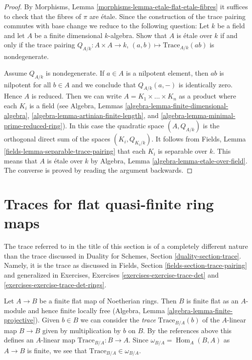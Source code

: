 \documentclass{stacks-project}
\theoremstyle{plain}
\theoremstyle{definition}
\theoremstyle{remark}
\numberwithin{equation}{subsection}
\def\Hom{\mathop{\mathrm{Hom}}\nolimits}
\begin{document}
\begin{proof}
By Morphisms, Lemma \ref{morphisms-lemma-etale-flat-etale-fibres}
it suffices to check that the fibres of $\pi$ are \'etale.
Since the construction of the trace pairing commutes with base
change we reduce to the following question: Let $k$ be a field
and let $A$ be a finite dimensional $k$-algebra. Show that
$A$ is \'etale over $k$ if and only if the trace pairing
$Q_{A/k} : A \times A \to k$, $(a, b) \mapsto \text{Trace}_{A/k}(ab)$
is nondegenerate.

\medskip\noindent
Assume $Q_{A/k}$ is nondegenerate. If $a \in A$ is a nilpotent element, then
$ab$ is nilpotent for all $b \in A$ and we conclude that $Q_{A/k}(a, -)$ is
identically zero. Hence $A$ is reduced. Then we can write
$A = K_1 \times \ldots \times K_n$ as a product where each $K_i$
is a field (see
Algebra, Lemmas \ref{algebra-lemma-finite-dimensional-algebra},
\ref{algebra-lemma-artinian-finite-length}, and
\ref{algebra-lemma-minimal-prime-reduced-ring}).
In this case the quadratic
space $(A, Q_{A/k})$ is the orthogonal direct sum of the spaces
$(K_i, Q_{K_i/k})$. It follows from
Fields, Lemma \ref{fields-lemma-separable-trace-pairing}
that each $K_i$ is separable over $k$. This means that $A$ is \'etale
over $k$ by Algebra, Lemma \ref{algebra-lemma-etale-over-field}.
The converse is proved by reading the argument backwards.
\end{proof}





\section{Traces for flat quasi-finite ring maps}
\label{section-quasi-finite-traces}

\noindent
The trace referred to in the title of this section is of a completely
different nature than the trace discussed in
Duality for Schemes, Section \ref{duality-section-trace}.
Namely, it is the trace
as discussed in Fields, Section \ref{fields-section-trace-pairing}
and generalized in Exercises, Exercises \ref{exercises-exercise-trace-det} and
\ref{exercises-exercise-trace-det-rings}.

\medskip\noindent
Let $A \to B$ be a finite flat map of Noetherian rings. Then $B$ is finite
flat as an $A$-module and hence finite locally free
(Algebra, Lemma \ref{algebra-lemma-finite-projective}).
Given $b \in B$ we can consider the {\it trace} $\text{Trace}_{B/A}(b)$
of the $A$-linear map $B \to B$ given by
multiplication by $b$ on $B$. By the references above this defines
an $A$-linear map $\text{Trace}_{B/A} : B \to A$.
Since $\omega_{B/A} = \Hom_A(B, A)$ as $A \to B$ is finite, we see
that $\text{Trace}_{B/A} \in \omega_{B/A}$.
\end{document}
